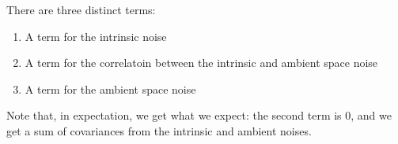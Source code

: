 \documentclass[12pt]{article}
\begin{document}
There are three distinct terms:
\begin{enumerate}
\item A term for the intrinsic noise
\item A term for the correlatoin between the intrinsic and ambient space noise
\item A term for the ambient space noise
\end{enumerate}

Note that, in expectation, we get what we expect: the second term is 0, and we get a sum of covariances from the intrinsic and ambient noises.
\end{document}
